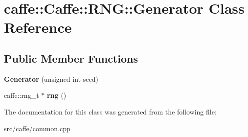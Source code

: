 \hypertarget{classcaffe_1_1_caffe_1_1_r_n_g_1_1_generator}{}\section{caffe\+:\+:Caffe\+:\+:R\+NG\+:\+:Generator Class Reference}
\label{classcaffe_1_1_caffe_1_1_r_n_g_1_1_generator}
\subsection*{Public Member Functions}
\begin{DoxyCompactItemize}
\item 
\mbox{\label{classcaffe_1_1_caffe_1_1_r_n_g_1_1_generator_a25f41946ec93504bb7b132ef5072c0fc}} 
{\bfseries Generator} (unsigned int seed)
\item 
\mbox{\label{classcaffe_1_1_caffe_1_1_r_n_g_1_1_generator_a43c97cbef420858b7f611396cc5093bf}} 
caffe\+::rng\+\_\+t $\ast$ {\bfseries rng} ()
\end{DoxyCompactItemize}


The documentation for this class was generated from the following file\+:\begin{DoxyCompactItemize}
\item 
src/caffe/common.\+cpp\end{DoxyCompactItemize}
